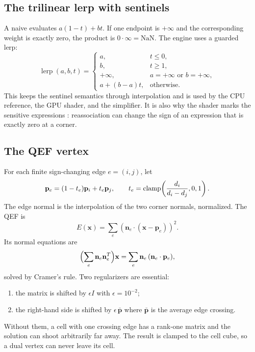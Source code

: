 \subsection{The trilinear lerp with sentinels}

A naive  evaluates $a(1-t)+bt$.  If one endpoint is
$+\infty$ and the corresponding weight is exactly zero, the product is
$0\cdot\infty=\mathrm{NaN}$.  The engine uses a guarded lerp:
\begin{equation}
  \operatorname{lerp}(a,b,t) =
  \begin{cases}
    a, & t\le 0,\\
    b, & t\ge 1,\\
    +\infty, & a=+\infty \text{ or } b=+\infty,\\
    a+(b-a)t, & \text{otherwise}.
  \end{cases}
  \label{eq:lerp}
\end{equation}
This keeps the sentinel semantics through interpolation and is used by the
CPU reference, the GPU shader, and the simplifier.  It is also why the
shader marks the sensitive expressions : reassociation can
change the sign of an expression that is exactly zero at a corner.

\subsection{The QEF vertex}

For each finite sign-changing edge $e=(i,j)$, let
\begin{equation}
  \mathbf{p}_e = (1-t_e)\mathbf{p}_i + t_e\mathbf{p}_j,
  \qquad
  t_e = \operatorname{clamp}\!\left(\frac{d_i}{d_i-d_j},0,1\right).
\end{equation}
The edge normal is the interpolation of the two corner normals,
normalized.  The QEF is
\begin{equation}
  E(\mathbf{x}) = \sum_e \left(\mathbf{n}_e\cdot
  (\mathbf{x}-\mathbf{p}_e)\right)^2 .
\end{equation}
Its normal equations are
\begin{equation}
  \Bigl(\sum_e \mathbf{n}_e\mathbf{n}_e^{T}\Bigr)\mathbf{x}
  = \sum_e \mathbf{n}_e\,(\mathbf{n}_e\cdot\mathbf{p}_e),
  \label{eq:qef}
\end{equation}
solved by Cramer's rule.  Two regularizers are essential:
\begin{enumerate}
\item the matrix is shifted by $\epsilon I$ with $\epsilon=10^{-2}$;
\item the right-hand side is shifted by $\epsilon\,\bar{\mathbf{p}}$
  where $\bar{\mathbf{p}}$ is the average edge crossing.
\end{enumerate}
Without them, a cell with one crossing edge has a rank-one matrix and the
solution can shoot arbitrarily far away.  The result is clamped to the
cell cube, so a dual vertex can never leave its cell.

